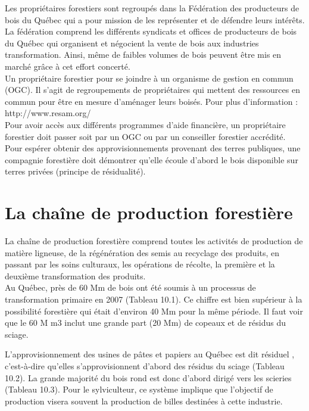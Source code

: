 Les propriétaires forestiers sont regroupés dans la Fédération des producteurs de bois du Québec qui a pour mission de les représenter et de défendre leurs intérêts. La fédération comprend les différents syndicats et offices de producteurs de bois du Québec qui organisent et négocient la vente de bois aux industries transformation. Ainsi, même de faibles volumes de bois peuvent être mis en marché grâce à cet effort concerté.\\

Un propriétaire forestier pour se joindre à un organisme de gestion en commun (OGC). Il s'agit de regroupements de propriétaires qui mettent des ressources en commun pour être en mesure d'aménager leurs boisés. Pour plus d'information : http://www.resam.org/\\

Pour avoir accès aux différents programmes d'aide financière, un propriétaire forestier doit passer soit par un OGC ou par un conseiller forestier accrédité.
\\

Pour espérer obtenir des approvisionnements provenant des terres publiques, une compagnie forestière doit démontrer qu'elle écoule d'abord le bois disponible sur terres privées (principe de résidualité).

\section{La chaîne de production forestière}

La chaîne de production forestière comprend toutes les activités de production de matière ligneuse, de la régénération des semis au recyclage des produits, en passant par les soins culturaux, les opérations de récolte, la première et la deuxième transformation des produits.\\

Au Québec, près de 60 Mm de bois ont été soumis à un processus de transformation primaire en 2007 (Tableau 10.1). Ce chiffre est bien supérieur à la possibilité forestière qui était d'environ 40 Mm pour la même période. Il faut voir que le 60 M m3 inclut une grande part (20 Mm) de copeaux et de résidus du sciage.



L'approvisionnement des usines de pâtes et papiers au Québec est dit  \og résiduel  \fg, c'est-à-dire qu'elles s'approvisionnent d'abord des résidus du sciage (Tableau 10.2). La grande majorité du bois rond est donc d'abord dirigé vers les scieries (Tableau 10.3). Pour le sylviculteur, ce système implique que l'objectif de production visera souvent la production de billes destinées à cette industrie.\\

